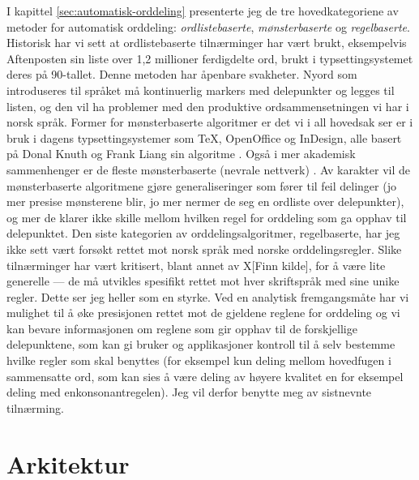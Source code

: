 I kapittel \ref{sec:automatisk-orddeling} presenterte jeg de tre hovedkategoriene av metoder for automatisk orddeling: \textit{ordlistebaserte}, \textit{mønsterbaserte} og \textit{regelbaserte}. Historisk har vi sett at ordlistebaserte tilnærminger har vært brukt, eksempelvis Aftenposten sin liste over 1,2 millioner ferdigdelte ord, brukt i typsettingsystemet deres på 90-tallet. Denne metoden har åpenbare svakheter. Nyord som introduseres til språket må kontinuerlig markers med delepunkter og legges til listen, og den vil ha problemer med den produktive ordsammensetningen vi har i norsk språk. Former for mønsterbaserte algoritmer er det vi i all hovedsak ser er i bruk i dagens typsettingsystemer som \TeX{}, OpenOffice og InDesign, alle basert på Donal Knuth og Frank Liang sin algoritme \cite{smrvz1996word, knuth1986texbook, wiki-tex}. Også i mer akademisk sammenhenger er de fleste mønsterbaserte (nevrale nettverk) \cite{nemeth2006automatic, kristensen1998two}. Av karakter vil de mønsterbaserte algoritmene gjøre generaliseringer som fører til feil delinger (jo mer presise mønsterene blir, jo mer nermer de seg en ordliste over delepunkter), og mer de klarer ikke skille mellom hvilken regel for orddeling som ga opphav til delepunktet. Den siste kategorien av orddelingsalgoritmer, regelbaserte, har jeg ikke sett vært forsøkt rettet mot norsk språk med norske orddelingsregler. Slike tilnærminger har vært kritisert, blant annet av X[Finn kilde], for å være lite generelle — de må utvikles spesifikt rettet mot hver skriftspråk med sine unike regler. Dette ser jeg heller som en styrke. Ved en analytisk fremgangsmåte har vi mulighet til å øke presisjonen rettet mot de gjeldene reglene for orddeling og vi kan bevare informasjonen om reglene som gir opphav til de forskjellige delepunktene, som kan gi bruker og applikasjoner kontroll til å selv bestemme hvilke regler som skal benyttes (for eksempel kun deling mellom hovedfugen i sammensatte ord, som kan sies å være deling av høyere kvalitet en for eksempel deling med enkonsonantregelen). Jeg vil derfor benytte meg av sistnevnte tilnærming.

\section{Arkitektur}

